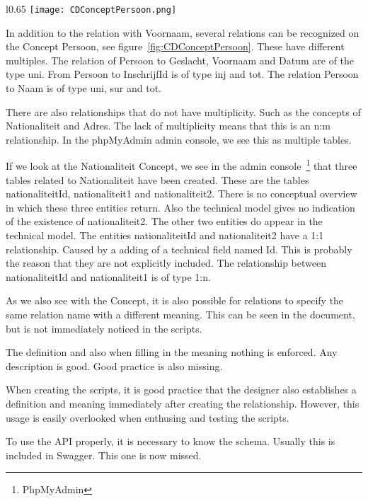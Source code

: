 \begin{wrapfigure}{l}{0.65\textwidth}
    \texttt{[image: CDConceptPersoon.png]} 
    \caption{\label{fig:CDConceptPersoon}CDConceptPersoon.}
\end{wrapfigure}
In addition to the relation with \mbox{Voornaam}, several relations can be recognized on the Concept \mbox{Persoon}, see figure~\ref{fig:CDConceptPersoon}.
These have different multiples.
The relation of \mbox{Persoon} to \mbox{Geslacht}, \mbox{Voornaam} and \mbox{Datum} are of the type \acrlong{uni}.
From \mbox{Persoon} to \mbox{InschrijfId} is of type \acrlong{inj} and \acrlong{tot}.
The relation \mbox{Persoon} to \mbox{Naam} is of type \acrlong{uni}, \acrlong{sur} and \acrlong{tot}.

There are also relationships that do not have multiplicity.
Such as the concepts of \mbox{Nationaliteit} and \mbox{Adres}.  
The lack of multiplicity means that this is an n:m relationship.
In the phpMyAdmin admin console, we see this as multiple tables.

If we look at the \mbox{Nationaliteit} Concept, we see in the admin console~\footnote{PhpMyAdmin} that three tables related to Nationaliteit have been created.
These are the tables \mbox{nationaliteitId}, \mbox{nationaliteit1} and \mbox{nationaliteit2}.
There is no conceptual overview in which these three entities return.
Also the technical model gives no indication of the existence of \mbox{nationaliteit2}.
The other two entities do appear in the technical model.
The entities \mbox{nationaliteitId} and \mbox{nationaliteit2} have a 1:1 relationship.
Caused by a adding of a technical field named Id.
This is probably the reason that they are not explicitly included.
The relationship between \mbox{nationaliteitId} and \mbox{nationaliteit1} is of type 1:n.

As we also see with the Concept, it is also possible for relations to specify the same relation name with a different meaning.
This can be seen in the document, but is not immediately noticed in the scripts.

The definition and also when filling in the meaning nothing is enforced.
Any description is good.
Good practice is also missing.

When creating the scripts, it is good practice that the designer also establishes a definition and meaning immediately after creating the relationship.
However, this usage is easily overlooked when enthusing and testing the scripts.

To use the API properly, it is necessary to know the schema.
Usually this is included in Swagger.
This one is now missed.

